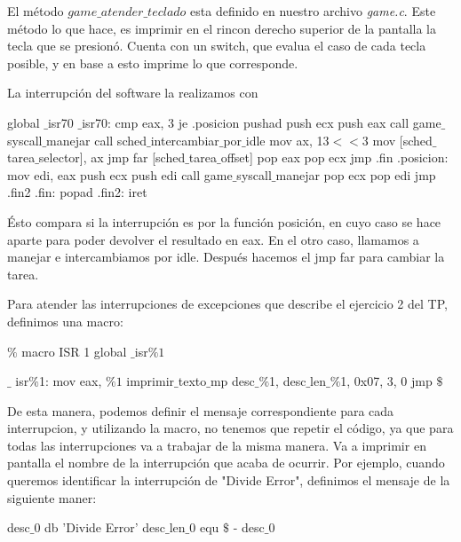 El m\'etodo \textit{$game\_atender\_teclado$} esta definido en nuestro archivo \textit{game.c}. Este m\'etodo lo que hace, es imprimir en el rincon derecho superior de la pantalla la tecla que se presion\'o.
Cuenta con un switch, que evalua el caso de cada tecla posible, y en base a esto imprime lo que corresponde.

La interrupción del software la realizamos con
\begin{algorithmic}
\State global $\_$isr70
\State $\_$isr70:
\State \tab cmp eax, 3
\State \tab je .posicion
\State \tab pushad
\State \tab push ecx
\State \tab push eax
\State \tab call game$\_$syscall$\_$manejar
\State \tab call sched$\_$intercambiar$\_$por$\_$idle
\State \tab mov ax, 13$<<$3
\State \tab mov [sched$\_$tarea$\_$selector], ax
\State \tab jmp far [sched$\_$tarea$\_$offset]
\State \tab pop eax
\State \tab pop ecx
\State \tab jmp .fin
\State .posicion:
\State \tab mov edi, eax
\State \tab push ecx
\State \tab push edi
\State \tab call game$\_$syscall$\_$manejar
\State \tab pop ecx
\State \tab pop edi
\State \tab jmp .fin2
\State .fin:
\State \tab popad
\State .fin2:
\State \tab iret
\end{algorithmic}
Ésto compara si la interrupción es por la función posición, en cuyo caso se hace aparte para poder devolver el resultado en eax. En el otro caso, llamamos a manejar e intercambiamos por idle. Después hacemos el jmp far para cambiar la tarea.

Para atender las interrupciones de excepciones que describe el ejercicio 2 del TP, definimos una macro:
\begin{algorithmic}
\State \tab $\%$ macro ISR 1
\State \tab global $\_$isr$\%1$

\State \tab $\_$ isr$\%$1:
    \State \tab \tab mov eax, $\%1$
    \State \tab \tab imprimir$\_$texto$\_$mp desc$\_\%$1, desc$\_$len$\_\%$1, 0x07, 3, 0
    \State \tab \tab jmp $\$$

\State \tab %
\end{algorithmic}

De esta manera, podemos definir el mensaje correspondiente para cada interrupcion, y utilizando la macro, no tenemos que repetir el c\'odigo, ya que para todas las interrupciones va a trabajar de la misma manera. Va a imprimir en pantalla el nombre de la interrupci\'on que acaba de ocurrir.
Por ejemplo, cuando queremos identificar la interrupci\'on de "Divide Error", definimos el mensaje de la siguiente maner:

\begin{algorithmic}
\State \tab desc$\_$0 db   'Divide Error'
\State \tab desc$\_$len$\_$0 equ     $\$$ - desc$\_$0
\end{algorithmic}

